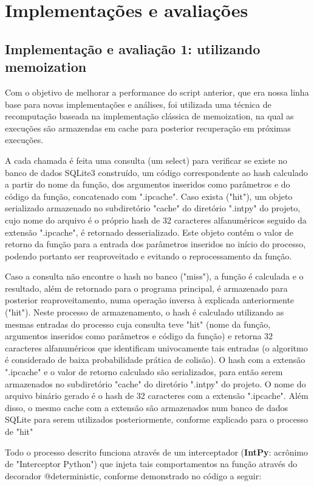 \documentclass[sigconf]{acmart}
\begin{document}
\section{Implementações e avaliações}
\subsection{Implementação e avaliação 1: utilizando memoization}
Com o objetivo de melhorar a performance do script anterior, que era nossa linha base para novas implementações e análises, foi utilizada uma técnica de recomputação baseada na implementação clássica de memoization, na qual as execuções são armazendas em cache para posterior recuperação em próximas execuções.

A cada chamada é feita uma consulta (um select) para verificar se existe no banco de dados SQLite3 construído, um código correspondente ao hash calculado a partir do nome da função, dos argumentos inseridos como parâmetros e do código da função, concatenado com ".ipcache". Caso exista ("hit"), um objeto serializado armazenado no subdiretório "cache" do diretório ".intpy" do projeto, cujo nome do arquivo é o próprio hash de 32 caracteres alfanuméricos seguido da extensão ".ipcache", é retornado desserializado. Este objeto contém o valor de retorno da função para a entrada dos parâmetros inseridos no início do processo, podendo portanto ser reaproveitado e evitando o reprocessamento da função. 

Caso a consulta não encontre o hash no banco ("miss"), a função é calculada e o resultado, além de retornado para o programa principal, é armazenado para posterior reaproveitamento, numa operação inversa à explicada anteriormente ("hit"). Neste processo de armazenamento, o hash é calculado utilizando as mesmas entradas do processo cuja consulta teve "hit" (nome da função, argumentos inseridos como parâmetros e código da função) e retorna 32 caracteres alfanuméricos que identificam univocamente tais entradas (o algoritmo é considerado de baixa probabilidade prática de colisão). O hash com a extensão ".ipcache" e o valor de retorno calculado são serializados, para então serem armazenados no subdiretório "cache" do diretório ".intpy" do projeto. O nome do arquivo binário gerado é o hash de 32 caracteres com a extensão ".ipcache". Além disso, o mesmo cache com a extensão são armazenados num banco de dados SQLite para serem utilizados posteriormente, conforme explicado para o processo de "hit"

Todo o processo descrito funciona através de um interceptador (\textbf{IntPy}: acrônimo de "Interceptor Python") que injeta tais comportamentos na função através do decorador @deterministic, conforme demonstrado no código a seguir:
\end{document}
